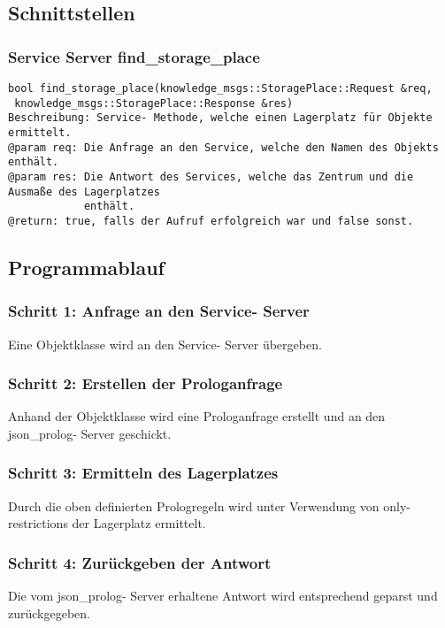 \documentclass{suturo}
\begin{document}
\subsection{Schnittstellen}

\subsubsection{Service Server find\_storage\_place}
\begin{verbatim}
bool find_storage_place(knowledge_msgs::StoragePlace::Request &req,
 knowledge_msgs::StoragePlace::Response &res)
Beschreibung: Service- Methode, welche einen Lagerplatz für Objekte ermittelt.
@param req: Die Anfrage an den Service, welche den Namen des Objekts enthält.  
@param res: Die Antwort des Services, welche das Zentrum und die Ausmaße des Lagerplatzes
            enthält.
@return: true, falls der Aufruf erfolgreich war und false sonst.
\end{verbatim}\label{func:findcluster}

\subsection{Programmablauf}
\subsubsection{Schritt 1: Anfrage an den Service- Server}
Eine Objektklasse wird an den Service- Server übergeben.
\subsubsection{Schritt 2: Erstellen der Prologanfrage}
Anhand der Objektklasse wird eine Prologanfrage erstellt und an den json\_prolog- Server geschickt.
\subsubsection{Schritt 3: Ermitteln des Lagerplatzes} 
Durch die oben definierten Prologregeln wird unter Verwendung von only- restrictions der Lagerplatz ermittelt.
\subsubsection{Schritt 4: Zurückgeben der Antwort}
Die vom json\_prolog- Server erhaltene Antwort wird entsprechend geparst und zurückgegeben.

\newpage
\end{document}
